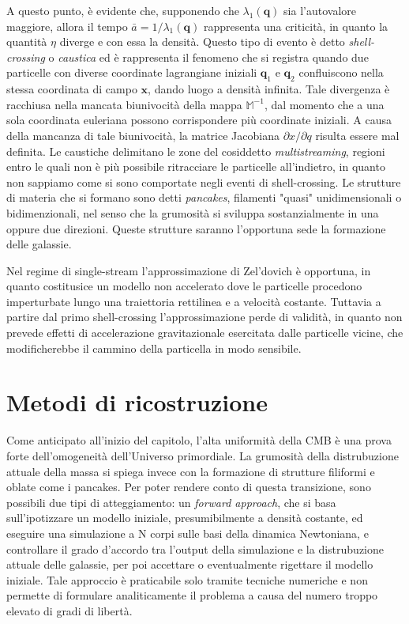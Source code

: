 A questo punto, è evidente che, supponendo che $\lambda_1(\bm{q})$ sia l'autovalore maggiore, allora il tempo 
$\bar{a}=1/\lambda_1(\bm{q})$ rappresenta una criticità, in quanto la quantità $\eta$ diverge e con essa la 
densità. Questo tipo di evento è detto \textit{shell-crossing} o \textit{caustica} ed è rappresenta il 
fenomeno che si registra quando due particelle con diverse coordinate lagrangiane iniziali 
$\bm{q}_1$ e $\bm{q}_2$ confluiscono nella stessa coordinata di campo $\bm{x}$, dando luogo a densità
infinita. 
Tale divergenza è racchiusa nella mancata biunivocità della mappa $\mathbb{M}^{-1}$, dal momento che a 
una sola coordinata euleriana possono corrispondere più coordinate iniziali. A causa della mancanza
di tale biunivocità, la matrice Jacobiana $\partial x/\partial q$ risulta essere mal definita.
Le caustiche delimitano le zone del cosiddetto \textit{multistreaming}, regioni entro le quali non è
più possibile ritracciare le particelle all'indietro, in quanto non sappiamo come si sono comportate
negli eventi di shell-crossing. Le strutture di materia che si formano sono detti \textit{pancakes},
filamenti "quasi" unidimensionali o bidimenzionali, nel senso che la grumosità si sviluppa 
sostanzialmente in una oppure due direzioni. Queste strutture saranno l'opportuna sede la formazione
delle galassie.

Nel regime di single-stream l'approssimazione di Zel'dovich è opportuna, in quanto costitusice 
un modello non accelerato dove le particelle procedono imperturbate lungo una traiettoria rettilinea
 e a velocità costante. Tuttavia a partire dal primo shell-crossing l'approssimazione perde di validità, 
in quanto non prevede effetti di accelerazione gravitazionale esercitata dalle particelle vicine, che 
modificherebbe il cammino della particella in modo sensibile. 

\section{Metodi di ricostruzione}

Come anticipato all'inizio del capitolo, l'alta uniformità della CMB è una prova forte dell'omogeneità 
dell'Universo primordiale. La grumosità della distrubuzione attuale della massa si spiega invece con 
la formazione di strutture filiformi e oblate come i pancakes. Per poter rendere conto di questa transizione,
sono possibili due tipi di atteggiamento: un \textit{forward approach}, che si basa sull'ipotizzare un 
modello iniziale, presumibilmente a densità costante, ed eseguire una simulazione a N corpi sulle basi 
della dinamica Newtoniana, e controllare il grado d'accordo tra l'output della simulazione e la 
distrubuzione attuale delle galassie, per poi accettare o eventualmente rigettare il modello iniziale.
Tale approccio è praticabile solo tramite tecniche numeriche e non permette di formulare analiticamente
il problema a causa del numero troppo elevato di gradi di libertà.

